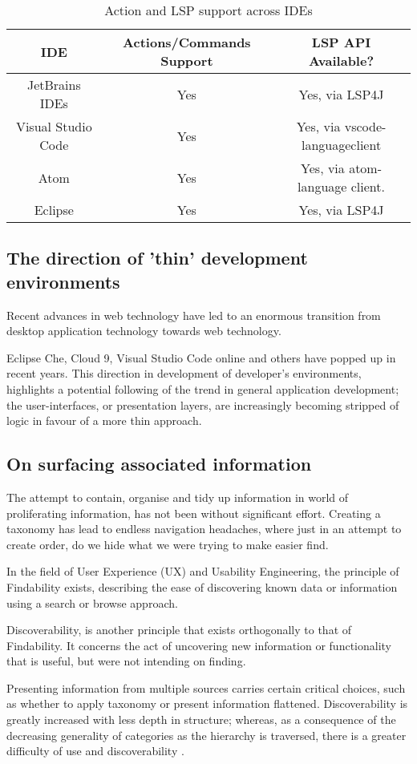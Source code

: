 \begin{table}[h!]
	\centering
	\begin{tabular}{ | c | c | c |}
		\hline
		IDE & Actions/Commands Support & LSP API Available?\\
		\hline
		\hline
		JetBrains IDEs & Yes & Yes, via LSP4J\\ 
		Visual Studio Code & Yes & Yes, via vscode-languageclient \\
		Atom & Yes & Yes, via atom-language client.\\
		Eclipse & Yes & Yes, via LSP4J\\
		\hline
	\end{tabular}
	\caption{Action and LSP support across IDEs}
	\label{table:1}
\end{table}

\subsection{The direction of 'thin' development environments}

Recent advances in web technology have led to an enormous transition from desktop application technology towards web technology. 


Eclipse Che, Cloud 9, Visual Studio Code online and others have popped up in recent years. This direction in development of developer's environments, highlights a potential following of the trend in general application development; the user-interfaces, or presentation layers, are increasingly becoming stripped of logic in favour of a more thin approach. 

\subsection{On surfacing associated information}

The attempt to contain, organise and tidy up information in world of proliferating information, has not been without significant effort. Creating a taxonomy has lead to endless navigation headaches, where just in an attempt to create order, do we hide what we were trying to make easier find. 

In the field of User Experience (UX) and Usability Engineering, the principle of Findability exists, describing the ease of discovering known data or information using a search or browse approach.

Discoverability, is another principle that exists orthogonally to that of Findability. It concerns the act of uncovering new information or functionality that is useful, but were not intending on finding.  

Presenting information from multiple sources carries certain critical choices, such as whether to apply taxonomy or present information flattened. Discoverability is greatly increased with less depth in structure; whereas, as a consequence of the decreasing generality of categories as the hierarchy is traversed, there is a greater difficulty of use and discoverability \parencite{nielsenNormanStructure}.
